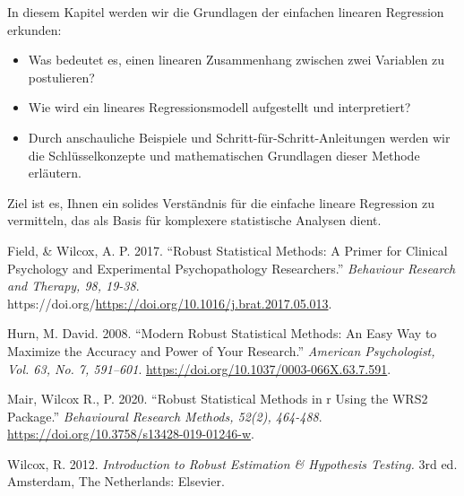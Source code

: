 \documentclass[
]{article}
\providecommand{\tightlist}{%
  \setlength{\itemsep}{0pt}\setlength{\parskip}{0pt}}
\newlength{\cslhangindent}
\newenvironment{CSLReferences}[2] %
 {\begin{list}{}{%
  \setlength{\itemindent}{0pt}
  \setlength{\leftmargin}{0pt}
  \setlength{\parsep}{0pt}
  \ifodd #1
   \setlength{\leftmargin}{\cslhangindent}
   \setlength{\itemindent}{-1\cslhangindent}
  \fi
  \setlength{\itemsep}{#2\baselineskip}}}
 {\end{list}}
\begin{document}
In diesem Kapitel werden wir die Grundlagen der einfachen linearen Regression erkunden:

\begin{itemize}
\tightlist
\item
  Was bedeutet es, einen linearen Zusammenhang zwischen zwei Variablen zu postulieren?
\item
  Wie wird ein lineares Regressionsmodell aufgestellt und interpretiert?
\item
  Durch anschauliche Beispiele und Schritt-für-Schritt-Anleitungen werden wir die Schlüsselkonzepte und mathematischen Grundlagen dieser Methode erläutern.
\end{itemize}

Ziel ist es, Ihnen ein solides Verständnis für die einfache lineare Regression zu vermitteln, das als Basis für komplexere statistische Analysen dient.

\label{refs}
\begin{CSLReferences}{1}{0}
Field, \& Wilcox, A. P. 2017. {``Robust Statistical Methods: A Primer for Clinical Psychology and Experimental Psychopathology Researchers.''} \emph{Behaviour Research and Therapy, 98, 19-38}. https://doi.org/\url{https://doi.org/10.1016/j.brat.2017.05.013}.

Hurn, M. David. 2008. {``Modern Robust Statistical Methods: An Easy Way to Maximize the Accuracy and Power of Your Research.''} \emph{American Psychologist, Vol. 63, No. 7, 591--601}. \url{https://doi.org/10.1037/0003-066X.63.7.591}.

Mair, Wilcox R., P. 2020. {``Robust Statistical Methods in r Using the WRS2 Package.''} \emph{Behavioural Research Methods, 52(2), 464-488}. \url{https://doi.org/10.3758/s13428-019-01246-w}.

Wilcox, R. 2012. \emph{Introduction to Robust Estimation \& Hypothesis Testing.} 3rd ed. Amsterdam, The Netherlands: {Elsevier}.

\end{CSLReferences}
\end{document}
